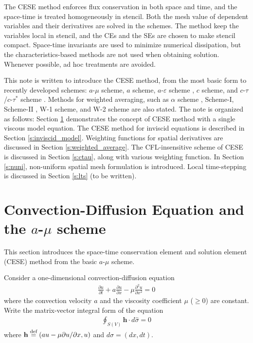 \documentclass{turgon}
\begin{document}
The CESE method enforces flux conservation in both space and time, and the
space-time is treated homogeneously in stencil.  Both the mesh value of
dependent variables and their derivatives are solved in the schemes.  The
method keep the variables local in stencil, and the CEs and the SEs are chosen
to make stencil compact.  Space-time invariants are used to minimize numerical
dissipation, but the characteristics-based methods are not used when obtaining
solution.  Whenever possible, ad hoc treatments are avoided.
\citep{chang_method_1995}

This note is written to introduce the CESE method, from the most basic form to
recently developed schemes: $a$-$\mu$ scheme, $a$ scheme, $a$-$\varepsilon$
scheme \citep{chang_method_1995}, $c$ scheme, and $c$-$\tau$/$c$-$\tau^*$
scheme \citep{chang_multi-dimensional_2003}.  Methods for weighted averaging,
such as $\alpha$ scheme \citep{chang_method_1995}, Scheme-I,
Scheme-II \citep{chang_courant_2002}, W-1 scheme, and W-2
scheme \citep{chang_multi-dimensional_2003} are also stated.  The note is
organized as follows: Section \ref{s:cese_intro} demonstrates the concept of
CESE method with a single viscous model equation.  The CESE method for inviscid
equations is described in Section \ref{s:inviscid_model}.  Weighting functions
for spatial derivatives are discussed in Section \ref{s:weighted_average}.  The
CFL-insensitive scheme of CESE is discussed in Section \ref{s:ctau}, along with
various weighting function.  In Section \ref{s:nuni}, non-uniform spatial mesh
formulation is introduced.  Local time-stepping is discussed in Section
\ref{s:lts} (to be written).

\section{Convection-Diffusion Equation and the $a$-$\mu$ scheme}
\label{s:cese_intro}

This section introduces the space-time conservation element and solution
element (CESE) method from the basic $a$-$\mu$ scheme.

Consider a one-dimensional convection-diffusion equation
\begin{align}
    \frac{\partial u}{\partial t} + a\frac{\partial u}{\partial x}
  - \mu\frac{\partial^2u}{\partial x^2} = 0 \label{e:conv_diff_govern}
\end{align}
where the convection velocity $a$ and the viscosity coefficient $\mu$ ($\ge0$)
are constant.  Write the matrix-vector integral form of the equation
\begin{align}
  \oint_{S(V)}\mathbf{h}\cdot d\hat{\sigma}=0 \label{e:conservation}
\end{align}
where $\mathbf{h} \defeq (au-\mu\partial u/\partial x,u)$ and $d\hat{\sigma} =
(dx, dt)$.
\end{document}
